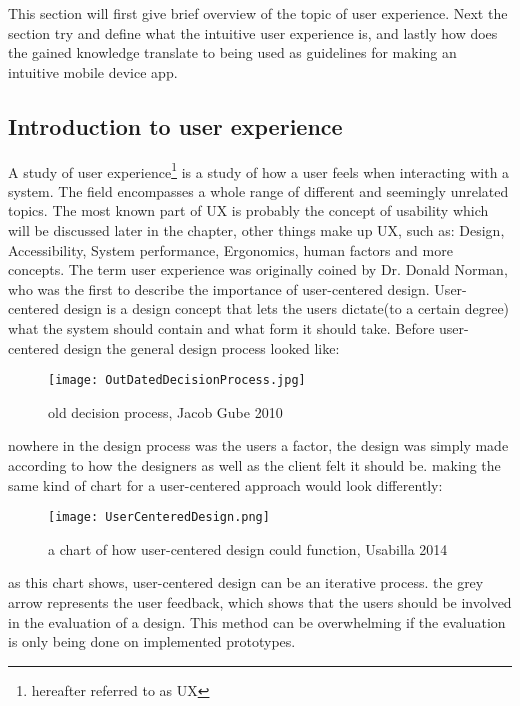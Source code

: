  This section will first give brief overview of the topic of user experience. Next the section try and define what the intuitive user experience is, and lastly how does the gained knowledge translate to being used as guidelines for making an intuitive mobile device app.  

\subsection{Introduction to user experience }
A study of user experience\footnote{hereafter referred to as UX} is a study of how a user feels when interacting with a system. The field encompasses a whole range of different and seemingly unrelated topics. The most known part of UX is probably the concept of usability which will be discussed later in the chapter, other things make up UX, such as: Design, Accessibility, System performance, Ergonomics, human factors and more concepts\cite{UXIntro}. The term user experience  was originally coined by Dr. Donald Norman, who was the first to describe the importance of user-centered design. User-centered design is a design concept that lets the users dictate(to a certain degree) what the system should contain and what form it should take.
Before user-centered design the general design process looked like:
\begin{figure}[H]
\centering
\texttt{[image: OutDatedDecisionProcess.jpg]}
\caption{old decision process, Jacob Gube 2010}
\end{figure}
nowhere in the design process was the users a factor, the design was simply made according to how the designers as well as the client felt it should be. making the same kind of chart for a user-centered approach would look differently:\\
\begin{figure}[H]
\centering
\texttt{[image: UserCenteredDesign.png]}
\caption{a chart of how user-centered design could function, Usabilla 2014}
\end{figure}
as this chart shows, user-centered design can be an iterative process. the grey arrow represents the user feedback, which shows that the users should be involved in the evaluation of a design. This method can be overwhelming if the evaluation is only being done on implemented prototypes.


